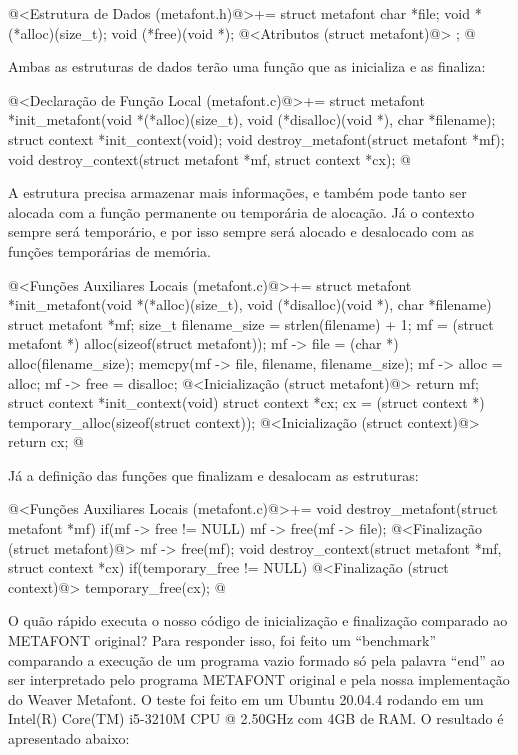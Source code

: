 \iniciocodigo
@<Estrutura de Dados (metafont.h)@>+=
struct metafont{
  char *file;
  void *(*alloc)(size_t);
  void (*free)(void *);
  @<Atributos (struct metafont)@>
};
@
\fimcodigo

Ambas as estruturas de dados terão uma função que as inicializa e as
finaliza:

\iniciocodigo
@<Declaração de Função Local (metafont.c)@>+=
struct metafont *init_metafont(void *(*alloc)(size_t),
                              void (*disalloc)(void *),
                              char *filename);
struct context *init_context(void);
void destroy_metafont(struct metafont *mf);
void destroy_context(struct metafont *mf, struct context *cx);
@
\fimcodigo

A estrutura  precisa armazenar mais informações,
e também pode tanto ser alocada com a função permanente ou temporária
de alocação. Já o contexto sempre será temporário, e por isso sempre
será alocado e desalocado com as funções temporárias de memória.

\iniciocodigo
@<Funções Auxiliares Locais (metafont.c)@>+=
struct metafont *init_metafont(void *(*alloc)(size_t),
                              void (*disalloc)(void *),
                              char *filename){
  struct metafont *mf;
  size_t filename_size = strlen(filename) + 1;
  mf = (struct metafont *) alloc(sizeof(struct metafont));
  mf -> file = (char *) alloc(filename_size);
  memcpy(mf -> file, filename, filename_size);
  mf -> alloc = alloc;
  mf -> free = disalloc;
  @<Inicialização (struct metafont)@>
  return mf;
}
struct context *init_context(void){
  struct context *cx;
  cx = (struct context *) temporary_alloc(sizeof(struct context));
  @<Inicialização (struct context)@>
  return cx;
}
@
\fimcodigo

Já a definição das funções que finalizam e desalocam as estruturas:

\iniciocodigo
@<Funções Auxiliares Locais (metafont.c)@>+=
void destroy_metafont(struct metafont *mf){
  if(mf -> free != NULL){
    mf -> free(mf -> file);
    @<Finalização (struct metafont)@>
    mf -> free(mf);
  }
}
void destroy_context(struct metafont *mf, struct context *cx){
  if(temporary_free != NULL){
    @<Finalização (struct context)@>
    temporary_free(cx);
  }
}
@
\fimcodigo

O quão rápido executa o nosso código de inicialização e finalização
comparado ao METAFONT original? Para responder isso, foi feito um
``benchmark'' comparando a execução de um programa vazio formado só
pela palavra ``end'' ao ser interpretado pelo programa METAFONT
original e pela nossa implementação do Weaver Metafont. O teste foi
feito em um Ubuntu 20.04.4 rodando em um Intel(R) Core(TM) i5-3210M
CPU @ 2.50GHz com 4GB de RAM. O resultado é apresentado abaixo:


